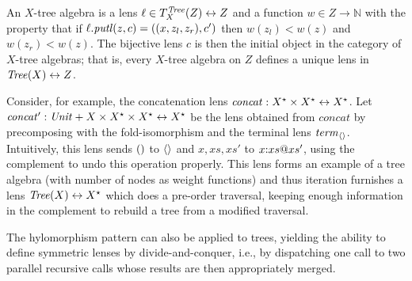 \begin{defn}[$R$-similarity]
\begin{theorem}
\begin{lemma}
\begin{theorem}[No products]
\begin{lemma}
\begin{defn}
\begin{theorem}
\begin{corollary}[Hylomorphism]
An $X$-tree algebra is a lens $\ell \in T^{\mathit{Tree}}_X(Z)\leftrightarrow Z$
and a function $w \in Z\rightarrow \mathbb{N}$ 
 with the property that if 
$\ell.\mathit{putl}(z,c) = ((x,z_l,z_r),c')$
 then $w(z_l) < w(z)$ and $w(z_r) < w(z)$. 
%
The bijective lens $c$ is then the initial object in the category of
$X$-tree algebras; that is, every $X$-tree algebra on $Z$ defines a unique
lens in $\mathit{Tree}(X)\leftrightarrow Z$.

Consider, for example, the concatenation lens
$\mathit{concat}:X^\star \times X^\star\leftrightarrow X^\star$. Let\label{concatprime}
$\mathit{concat'}:\mathit{Unit} + X \times X^\star \times X^\star \leftrightarrow
X^\star$ be the lens obtained from $\mathit{concat}$ by precomposing
with the fold-isomorphism and the terminal lens $\mathit{term}_{\left<\right>}$.
Intuitively, this lens sends ${()}$ to $\left<\right>$ and $x,xs,xs'$ to
$x \mathord{:} xs @ xs'$, using the complement to undo this operation
properly. This lens forms an example of a tree algebra (with number of
nodes as weight functions) and thus iteration furnishes a lens
$\mathit{Tree}(X)\leftrightarrow X^\star$ which does a pre-order traversal, keeping enough
information in the complement to rebuild a tree from a modified traversal.

The hylomorphism pattern can also be applied to trees,
yielding the ability to define symmetric lenses by
divide-and-conquer, i.e., by dispatching one call to two parallel
recursive calls whose results are then appropriately merged.







\end{corollary}
\end{theorem}
\end{defn}
\end{lemma}
\end{theorem}
\end{lemma}
\end{theorem}
\end{defn}
